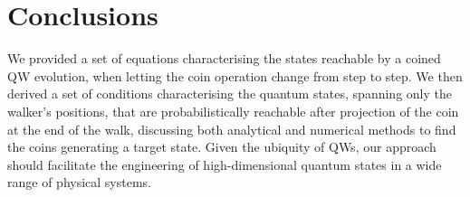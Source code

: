 \section{Conclusions}
\label{sec:QWs:conclusions}
We provided a set of equations characterising the states reachable by a coined \ac{QW} evolution, when letting the coin operation change from step to step.
We then derived a set of conditions characterising the quantum states, spanning only the walker's positions, that are probabilistically reachable after projection of the coin at the end of the walk, discussing both analytical and numerical methods to find the coins generating a target state.
Given the ubiquity of \acp{QW}, our approach should facilitate the engineering of high-dimensional quantum states in a wide range of physical systems.


